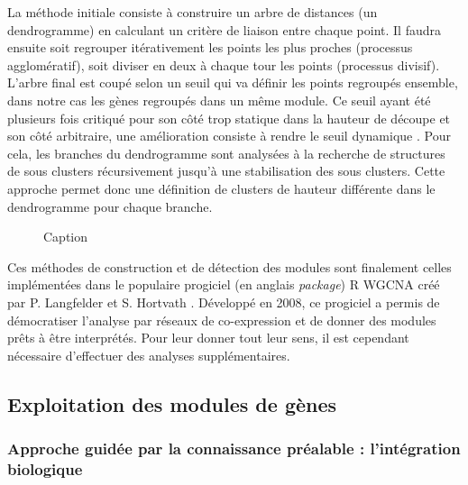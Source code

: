 La méthode initiale \cite{Murtagh2012Jan} consiste à construire un arbre de distances (un dendrogramme) en calculant un critère de liaison entre chaque point. Il faudra ensuite soit regrouper itérativement les points les plus proches (processus agglomératif), soit diviser en deux à chaque tour les points (processus divisif). L'arbre final est coupé selon un seuil qui va définir les points regroupés ensemble, dans notre cas les gènes regroupés dans un même module. Ce seuil ayant été plusieurs fois critiqué pour son côté trop statique dans la hauteur de découpe et son côté arbitraire, une amélioration consiste à rendre le seuil dynamique \cite{Langfelder2008_cutree}. Pour cela, les branches du dendrogramme sont analysées à la recherche de structures de sous clusters récursivement jusqu'à une stabilisation des sous clusters. Cette approche permet donc une définition de clusters de hauteur différente dans le dendrogramme pour chaque branche.

\begin{figure}
    \centering
    \caption{Caption}
    \label{fig:my_label}
\end{figure}


Ces méthodes de construction et de détection des modules sont finalement celles implémentées dans le populaire progiciel (en anglais \textit{package}) R WGCNA créé par P. Langfelder et S. Hortvath \cite{Langfelder2008}. Développé en 2008, ce progiciel a permis de démocratiser l'analyse par réseaux de co-expression et de donner des modules prêts à être interprétés. Pour leur donner tout leur sens, il est cependant nécessaire d'effectuer des analyses supplémentaires.



\subsection{Exploitation des modules de gènes}

\subsubsection{Approche guidée par la connaissance préalable : l'intégration biologique}

